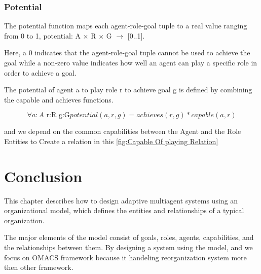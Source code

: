 \subsubsection{Potential}
The potential function maps each agent-role-goal tuple to a real value ranging from 0 to 1, 
potential: A $\times$ R $\times$ G $\rightarrow$ [0..1]\cite{omacs4}.

Here, a 0 indicates that the agent-role-goal tuple cannot be
used to achieve the goal while a non-zero value indicates how well an agent can play
a specific role in order to achieve a goal.  

The potential of agent a to play role r 
to achieve goal g is defined by combining the capable and achieves functions\cite{omacs4}.

\begin{equation}
\forall a:A\textrm{ r:R g:G}potential(a,r,g)=achieves(r,g)*capable(a,r)\label{eq:potentialFunc}
\end{equation}

and we depend on the common capabilities between the Agent and the Role Entities to Create a relation in this \ref{fig:Capable Of playing Relation} 


  


\section{Conclusion}
This chapter describes how to design adaptive multiagent
systems using an organizational model, which defines the
entities and relationships of a typical organization.

The major elements of the model consist of goals, roles, agents,
capabilities, and the relationships between them. By
designing a system using the model, and we focus on OMACS framework
because it handeling reorganization system more then other framework.



